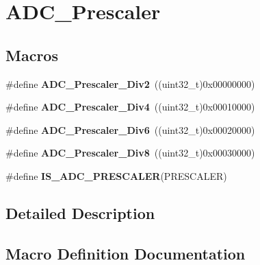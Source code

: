 \hypertarget{group___a_d_c___prescaler}{}\section{A\+D\+C\+\_\+\+Prescaler}
\label{group___a_d_c___prescaler}
\subsection*{Macros}
\begin{DoxyCompactItemize}
\item 
\#define {\bfseries A\+D\+C\+\_\+\+Prescaler\+\_\+\+Div2}~((uint32\+\_\+t)0x00000000)\hypertarget{group___a_d_c___prescaler_gaedf3593442796684ace09bce1c6a5dde}{}\label{group___a_d_c___prescaler_gaedf3593442796684ace09bce1c6a5dde}

\item 
\#define {\bfseries A\+D\+C\+\_\+\+Prescaler\+\_\+\+Div4}~((uint32\+\_\+t)0x00010000)\hypertarget{group___a_d_c___prescaler_ga8835521adcb2239c0bc0eec8f5eb8711}{}\label{group___a_d_c___prescaler_ga8835521adcb2239c0bc0eec8f5eb8711}

\item 
\#define {\bfseries A\+D\+C\+\_\+\+Prescaler\+\_\+\+Div6}~((uint32\+\_\+t)0x00020000)\hypertarget{group___a_d_c___prescaler_ga49cb7f0ac571b5a9105ac7c037559d63}{}\label{group___a_d_c___prescaler_ga49cb7f0ac571b5a9105ac7c037559d63}

\item 
\#define {\bfseries A\+D\+C\+\_\+\+Prescaler\+\_\+\+Div8}~((uint32\+\_\+t)0x00030000)\hypertarget{group___a_d_c___prescaler_gae56f649c15bfb0cbb87f6456a320664f}{}\label{group___a_d_c___prescaler_gae56f649c15bfb0cbb87f6456a320664f}

\item 
\#define {\bfseries I\+S\+\_\+\+A\+D\+C\+\_\+\+P\+R\+E\+S\+C\+A\+L\+ER}(P\+R\+E\+S\+C\+A\+L\+ER)
\end{DoxyCompactItemize}


\subsection{Detailed Description}


\subsection{Macro Definition Documentation}
